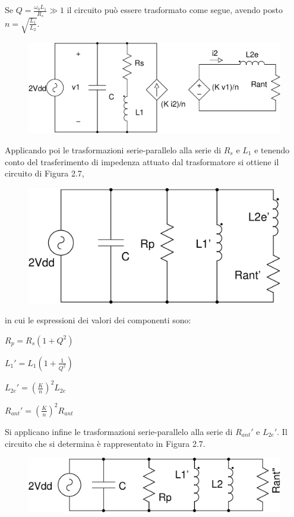 \documentclass[a4paper, 12pt]{memoir}
\begin{document}
Se $ Q = \frac{\omega_0 L_1}{R_s} \gg 1 $ il circuito può essere trasformato
come segue, avendo posto $n=\sqrt{\frac{L_1}{L_2}}$.
\begin{figure}[h!]
\includegraphics[height=0.2\textheight]{images/cir_model1.pdf}
\centering
\caption{}
\end{figure}

Applicando poi le trasformazioni serie-parallelo\cite[pp. 63-64]{RazaviRF}
alla serie di $R_s$ e $L_1$ e tenendo conto del trasferimento di impedenza
attuato dal trasformatore\cite[pp. 322-323]{GuarnieriET} si ottiene il circuito
di Figura 2.7, 
\begin{figure}[h!]
\includegraphics[height=0.13\textheight]{images/cir_model2.pdf}
\centering
\caption{}
\end{figure}

\noindent in cui le espressioni dei valori dei componenti sono:
\begin{description}
\item $ R_p = R_s \left( 1+Q^2 \right) $
\item $ L_1' = L_1 \left( 1+\frac{1}{Q^2} \right) $
\item $ L_{2e}' = {\left( \frac{K}{n} \right)}^2 L_{2e} $
\item $ R_{ant}' = {\left( \frac{K}{n} \right)}^2 R_{ant} $
\end{description}

Si applicano infine le trasformazioni serie-parallelo alla serie di  $R_{ant}'$
e $L_{2e}'$. Il circuito che si determina è rappresentato in Figura 2.7. 
\begin{figure}[h!]
\centering
\includegraphics[height=0.1\textheight]{images/cir_model3.pdf}
\caption{}
\end{figure}
\end{document}
